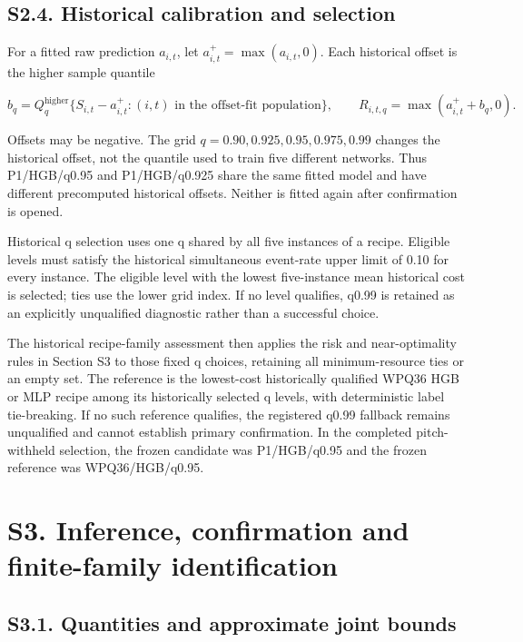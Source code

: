 \documentclass[
  british,
  11pt,
]{article}
\begin{document}
\subsection{S2.4. Historical calibration and
selection}\label{s2.4.-historical-calibration-and-selection}

For a fitted raw prediction \(a_{i,t}\), let
\(a^+_{i,t}=\max(a_{i,t},0)\). Each historical offset is the higher
sample quantile

\[
b_q=Q_q^{\mathrm{higher}}\{S_{i,t}-a^+_{i,t}: (i,t)\text{ in the offset-fit population}\},
\qquad R_{i,t,q}=\max(a^+_{i,t}+b_q,0).
\]

Offsets may be negative. The grid \(q=0.90,0.925,0.95,0.975,0.99\)
changes the historical offset, not the quantile used to train five
different networks. Thus P1/HGB/q0.95 and P1/HGB/q0.925 share the same
fitted model and have different precomputed historical offsets. Neither
is fitted again after confirmation is opened.

Historical q selection uses one q shared by all five instances of a
recipe. Eligible levels must satisfy the historical simultaneous
event-rate upper limit of 0.10 for every instance. The eligible level
with the lowest five-instance mean historical cost is selected; ties use
the lower grid index. If no level qualifies, q0.99 is retained as an
explicitly unqualified diagnostic rather than a successful choice.

The historical recipe-family assessment then applies the risk and
near-optimality rules in Section S3 to those fixed q choices, retaining
all minimum-resource ties or an empty set. The reference is the
lowest-cost historically qualified WPQ36 HGB or MLP recipe among its
historically selected q levels, with deterministic label tie-breaking.
If no such reference qualifies, the registered q0.99 fallback remains
unqualified and cannot establish primary confirmation. In the completed
pitch-withheld selection, the frozen candidate was P1/HGB/q0.95 and the
frozen reference was WPQ36/HGB/q0.95.

\section{S3. Inference, confirmation and finite-family
identification}\label{s3.-inference-confirmation-and-finite-family-identification}

\subsection{S3.1. Quantities and approximate joint
bounds}\label{s3.1.-quantities-and-approximate-joint-bounds}
\end{document}
